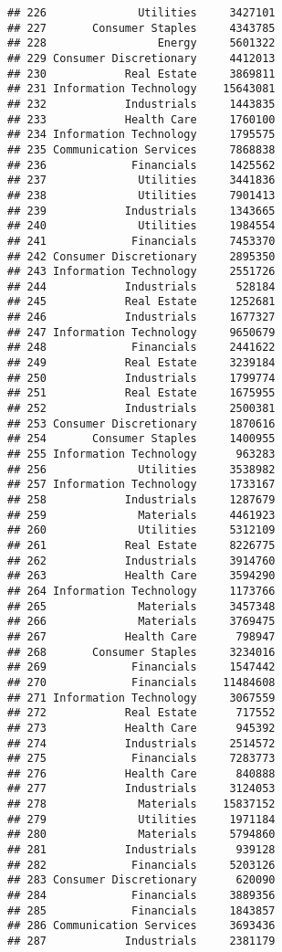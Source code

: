 \documentclass[
]{article}
\begin{document}
\begin{verbatim}
## 226              Utilities     3427101
## 227       Consumer Staples     4343785
## 228                 Energy     5601322
## 229 Consumer Discretionary     4412013
## 230            Real Estate     3869811
## 231 Information Technology    15643081
## 232            Industrials     1443835
## 233            Health Care     1760100
## 234 Information Technology     1795575
## 235 Communication Services     7868838
## 236             Financials     1425562
## 237              Utilities     3441836
## 238              Utilities     7901413
## 239            Industrials     1343665
## 240              Utilities     1984554
## 241             Financials     7453370
## 242 Consumer Discretionary     2895350
## 243 Information Technology     2551726
## 244            Industrials      528184
## 245            Real Estate     1252681
## 246            Industrials     1677327
## 247 Information Technology     9650679
## 248             Financials     2441622
## 249            Real Estate     3239184
## 250            Industrials     1799774
## 251            Real Estate     1675955
## 252            Industrials     2500381
## 253 Consumer Discretionary     1870616
## 254       Consumer Staples     1400955
## 255 Information Technology      963283
## 256              Utilities     3538982
## 257 Information Technology     1733167
## 258            Industrials     1287679
## 259              Materials     4461923
## 260              Utilities     5312109
## 261            Real Estate     8226775
## 262            Industrials     3914760
## 263            Health Care     3594290
## 264 Information Technology     1173766
## 265              Materials     3457348
## 266              Materials     3769475
## 267            Health Care      798947
## 268       Consumer Staples     3234016
## 269             Financials     1547442
## 270             Financials    11484608
## 271 Information Technology     3067559
## 272            Real Estate      717552
## 273            Health Care      945392
## 274            Industrials     2514572
## 275             Financials     7283773
## 276            Health Care      840888
## 277            Industrials     3124053
## 278              Materials    15837152
## 279              Utilities     1971184
## 280              Materials     5794860
## 281            Industrials      939128
## 282             Financials     5203126
## 283 Consumer Discretionary      620090
## 284             Financials     3889356
## 285             Financials     1843857
## 286 Communication Services     3693436
## 287            Industrials     2381179

\end{verbatim}
\end{document}
